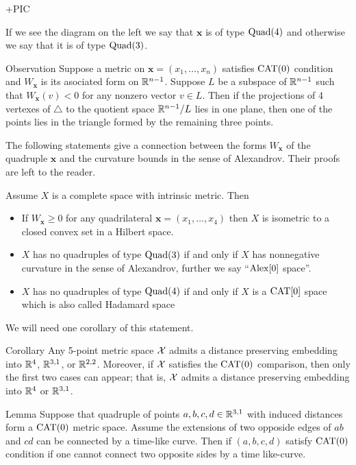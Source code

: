 \documentclass{article}
\begin{document}
+PIC

If we see the diagram on the left we say that $\bm{x}$ is 
of type $\text{\rm Quad}(4)$ and otherwise we say that it is of type $\text{\rm Quad}(3)$.


\begin{thm}{Observation}\label{triangle-inq}
Suppose a metric on $\bm{x}=(x_1,\dots,x_n)$ satisfies $\mathrm{CAT}(0)$ condition
and $W_{\bm{x}}$ is its asociated form on $\mathbb{R}^{n-1}$.
Suppose $L$ be a subspace of $\mathbb{R}^{n-1}$ such that
$W_{\bm{x}}(v)< 0$ for any nonzero vector $v\in L$.
Then if the projections of 4 vertexes of $\triangle$ to the quotient space $\mathbb{R}^{n-1}/L$ lies in one plane, then one of the points lies in the triangle formed by the remaining three points.
\end{thm}

The following statements give a connection between the forms $W_{\bm{x}}$ of the quadruple $\bm{x}$
and the curvature bounds in the sense of Alexandrov.
Their proofs are left to the reader.

Assume $X$ is a complete space with intrinsic metric.
Then
\begin{itemize}
\item If $W_{\bm{x}}\ge 0$ 
for any quadrilateral $\bm{x}=(x_1,\dots,x_4)$ 
then $X$ is isometric to a closed convex set in a Hilbert space. 
\item $X$ has no quadruples of type $\text{\rm Quad}(3)$ if and only if 
$X$ has nonnegative curvature in the sense of Alexandrov, further we say ``$\mathrm{Alex}[0]$ space''.
\item $X$ has no quadruples of type $\text{\rm Quad}(4)$ if and only if 
$X$ is a $\mathrm{CAT}[0]$ space which is also called Hadamard space
\end{itemize}

We will need one corollary of this statement.

\begin{thm}{Corollary}
Any 5-point metric space $\mathcal{X}$ admits a distance preserving embedding into $\mathbb{R}^{4}$, $\mathbb{R}^{3,1}$, or $\mathbb{R}^{2,2}$.
Moreover, if $\mathcal{X}$ satisfies the $\mathrm{CAT}(0)$ comparison, then only the first two cases can appear; that is, $\mathcal{X}$ admits a distance preserving embedding into $\mathbb{R}^{4}$ or $\mathbb{R}^{3,1}$.
\end{thm}

\qeds

\begin{thm}{Lemma}
Suppose that quadruple of points $a,b,c,d\in \mathbb{R}^{3,1}$ with induced distances form a $\mathrm{CAT}(0)$ metric space.
Assume the extensions of two opposide edges of $ab$ and $cd$ can be connected by a time-like curve.
Then if $(a,b,c,d)$ satisfy $\mathrm{CAT}(0)$ condition if one cannot connect two opposite sides by a time like-curve.
  
\end{thm}
\end{document}
